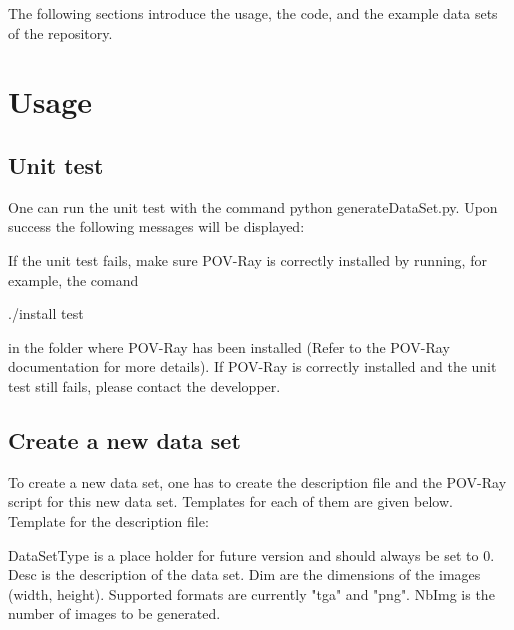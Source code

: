 The following sections introduce the usage, the code, and the example data sets of the repository.\\

\section{Usage}

\subsection{Unit test}

One can run the unit test with the command python generateDataSet.py. Upon success the following messages will be displayed:

\begin{scriptsize}
\begin{ttfamily}

\end{ttfamily}
\end{scriptsize}

If the unit test fails, make sure POV-Ray is correctly installed by running, for example, the comand \begin{ttfamily}./install test\end{ttfamily} in the folder where POV-Ray has been installed (Refer to the POV-Ray documentation for more details). If POV-Ray is correctly installed and the unit test still fails, please contact the developper.

\subsection{Create a new data set}

To create a new data set, one has to create the description file and the POV-Ray script for this new data set. Templates for each of them are given below.\\
 
Template for the description file:\\
\begin{scriptsize}
\begin{ttfamily}

\end{ttfamily}
\end{scriptsize}

DataSetType is a place holder for future version and should always be set to 0. Desc is the description of the data set. Dim are the dimensions of the images (width, height). Supported formats are currently "tga" and "png". NbImg is the number of images to be generated.\\

